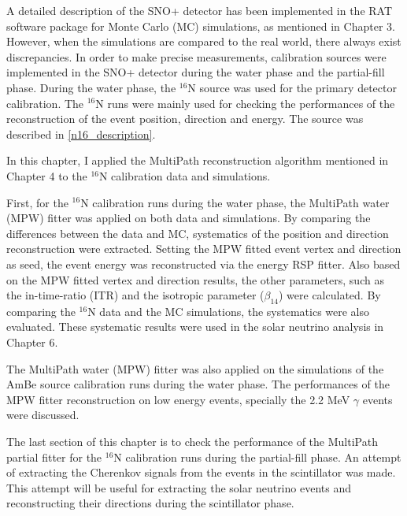 A detailed description of the SNO+ detector has been implemented in the RAT software package for Monte Carlo (MC) simulations, as mentioned in Chapter 3. However, when the simulations are compared to the real world, there always exist discrepancies. In order to make precise measurements, calibration sources were implemented in the SNO+ detector during the water phase and the partial-fill phase. During the water phase, the $^{16}$N source was used for the primary detector calibration. The $^{16}$N runs were mainly used for checking the performances of the reconstruction of the event position, direction and energy. The source was described in \ref{n16_description}.

In this chapter, I applied the MultiPath reconstruction algorithm mentioned in Chapter 4 to the $^{16}$N calibration data and simulations.

First, for the $^{16}$N calibration runs during the water phase, the MultiPath water (MPW) fitter was applied on both data and simulations. By comparing the differences between the data and MC, systematics of the position and direction reconstruction were extracted. Setting the MPW fitted event vertex and direction as seed, the event energy was reconstructed via the energy RSP fitter. Also based on the MPW fitted vertex and direction results, the other parameters, such as the in-time-ratio (ITR) and the isotropic parameter ($\beta_{14}$) were calculated. By comparing the $^{16}$N data and the MC simulations, the systematics were also evaluated. These systematic results were used in the solar neutrino analysis in Chapter 6.

The MultiPath water (MPW) fitter was also applied on the simulations of the AmBe source calibration runs during the water phase. The performances of the MPW fitter reconstruction on low energy events, specially the 2.2 MeV $\gamma$ events were discussed.

The last section of this chapter is to check the performance of the MultiPath partial fitter for the $^{16}$N calibration runs during the partial-fill phase. An attempt of extracting the Cherenkov signals from the events in the scintillator was made. This attempt will be useful for extracting the solar neutrino events and reconstructing their directions during the scintillator phase. 

